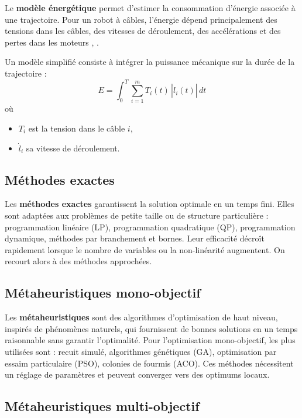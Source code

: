 Le \textbf{modèle énergétique} permet d'estimer la consommation d'énergie associée à une trajectoire. Pour un robot à câbles, l'énergie dépend principalement des tensions dans les câbles, des vitesses de déroulement, des accélérations et des pertes dans les moteurs \cite{gasparetto2015}, \cite{lspb}.

Un modèle simplifié consiste à intégrer la puissance mécanique sur la durée de la trajectoire :
\begin{equation}
E = \int_{0}^{T} \sum_{i=1}^{m} T_i(t) \, |\dot{l}_i(t)| \, dt
\label{eq:energie}
\end{equation}
où
\begin{itemize}
\item $T_i$ est la tension dans le câble $i$,
\item $\dot{l}_i$ sa vitesse de déroulement.
\end{itemize}

\subsection{Méthodes exactes}

Les \textbf{méthodes exactes} garantissent la solution optimale en un temps fini. Elles sont adaptées aux problèmes de petite taille ou de structure particulière \cite{gasparetto2015} : programmation linéaire (LP), programmation quadratique (QP), programmation dynamique, méthodes par branchement et bornes. Leur efficacité décroît rapidement lorsque le nombre de variables ou la non-linéarité augmentent. On recourt alors à des méthodes approchées.

\subsection{Métaheuristiques mono-objectif}

Les \textbf{métaheuristiques} sont des algorithmes d'optimisation de haut niveau, inspirés de phénomènes naturels, qui fournissent de bonnes solutions en un temps raisonnable sans garantir l'optimalité. Pour l'optimisation mono-objectif, les plus utilisées sont \cite{gasparetto2015} : recuit simulé, algorithmes génétiques (GA), optimisation par essaim particulaire (PSO), colonies de fourmis (ACO). Ces méthodes nécessitent un réglage de paramètres et peuvent converger vers des optimums locaux.

\subsection{Métaheuristiques multi-objectif}

